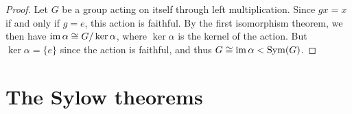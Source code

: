 \begin{proof}
    Let \(G\) be a group acting on itself through left multiplication. Since
    \(gx = x\) if and only if \(g = e\), this action is faithful. By the first
    isomorphism theorem, we then have \(\operatorname{im} \alpha \cong G/\ker \alpha\), where
    \(\ker \alpha\) is the kernel of the action. But \(\ker \alpha = \{e\}\)
    since the action is faithful, and thus \(G \cong \operatorname{im} \alpha <
    \operatorname{Sym}(G)\).
\end{proof}


\section{The Sylow theorems}
